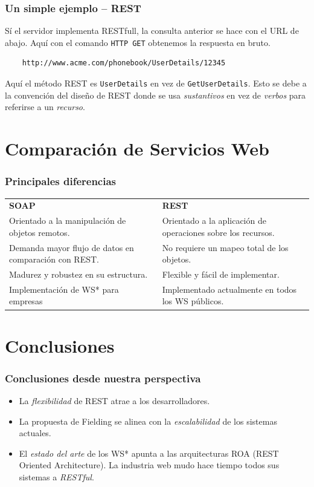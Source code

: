 \documentclass{beamer}
\begin{document}
\begin{frame}[fragile]{\insertsection{}}
  \frametitle{Un simple ejemplo -- REST}
  Sí el servidor implementa RESTfull, la consulta anterior se hace con
  el URL de abajo. Aquí con el comando \texttt{HTTP GET} obtenemos la
  respuesta en bruto.

  \begin{lstlisting}
    http://www.acme.com/phonebook/UserDetails/12345
  \end{lstlisting}

  Aquí el método REST es \texttt{UserDetails} en vez de
  \texttt{GetUserDetails}. Esto se debe a la convención del diseño de
  REST donde se usa \emph{sustantivos} en vez de \emph{verbos} para
  referirse a un \emph{recurso}.
\end{frame}

\section{Comparación de Servicios Web}

\begin{frame}[fragile]{\insertsection{}}
  \frametitle{Principales diferencias}
  \centering
  \footnotesize
  \bgroup
  \def\arraystretch{1.8}%
  \begin{tabular}{m{5cm}m{5cm}}
    \textbf{SOAP} & \textbf{REST}\\
    Orientado a la manipulación  de objetos remotos. & Orientado a la
    aplicación de operaciones sobre los recursos. \\\pause
    Demanda mayor flujo de datos en comparación con REST. & No requiere
    un mapeo total de los objetos. \\ \pause
    Madurez y robustez en su estructura. & Flexible y fácil de
    implementar.\\ \pause
    Implementación de WS* para empresas & Implementado actualmente en
    todos los WS públicos.\\
  \end{tabular}
  \egroup
\end{frame}

\section{Conclusiones}

\begin{frame}[fragile]{\insertsection{}}
  \frametitle{Conclusiones desde nuestra perspectiva}
  
  \begin{itemize}
    \setlength\itemsep{2em}
  \item<1-> La \emph{flexibilidad} de REST atrae a los
    desarrolladores.
  \item<2-> La propuesta de Fielding se alinea con la
    \emph{escalabilidad} de los sistemas actuales.
  \item<3-> El \emph{estado del arte} de los WS* apunta a las
    arquitecturas ROA (REST Oriented Architecture). La industria web
    mudo hace tiempo todos sus sistemas a \emph{RESTful}.
  \end{itemize}
\end{frame}
\end{document}
